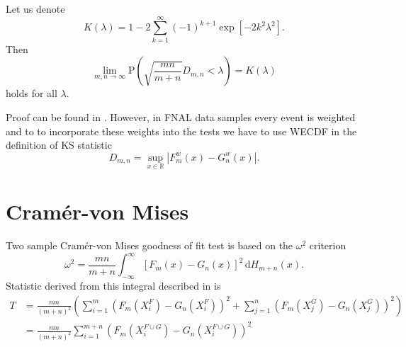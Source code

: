 \begin{theorem}[Smirnov]
	Let us denote  
	\begin{equation}
	K(\lambda) = 1 - 2\sum_{k=1}^{\infty} (-1)^{k+1} \exp\left[ -2k^2\lambda^2\right].
	\end{equation}
	Then 
	\begin{equation}
	\lim_{m,n \rightarrow \infty} \mathrm{P}(\sqrt{\frac{mn}{m+n}}D_{m,n} < \lambda) = K(\lambda)
	\end{equation}
	holds for all $\lambda$.
\end{theorem}
\noindent Proof can be found in \cite{Smirnov1944}. 
However, in FNAL data samples every event is weighted and to to incorporate these weights into the tests we have to use WECDF in the definition of KS statistic
\begin{equation}
D_{m,n} = \sup_{x \in \mathbb{R}} |F^w_m(x) - G^w_n(x)|.
\end{equation}

\section{Cram\'{e}r-von Mises}
Two sample Cram\'{e}r-von Mises goodness of fit test is based on the $\omega^2$ criterion
\begin{equation}
\omega^2 = \frac{mn}{m+n} \int_{-\infty}^\infty \left[F_m(x) - G_n(x) \right]^2 \,\mathrm{d} H_{m+n}(x).
\end{equation} 
Statistic derived from this integral described in \cite{Anderson62} is
\begin{align}
T & = \frac{mn}{(m+n)^2}\left( \sum_{i=1}^m \left( F_m(X^F_i) - G_n(X^F_i)\right)^2 + \sum_{j=1}^n \left( F_m(X^G_j) - G_n(X^G_j)\right)^2 \right) \\
& = \frac{mn}{(m+n)^2} \sum_{i=1}^{m+n} \left( F_m(X^{F\cup G}_i) - G_n(X^{F\cup G}_i)\right)^2  %
\end{align}


